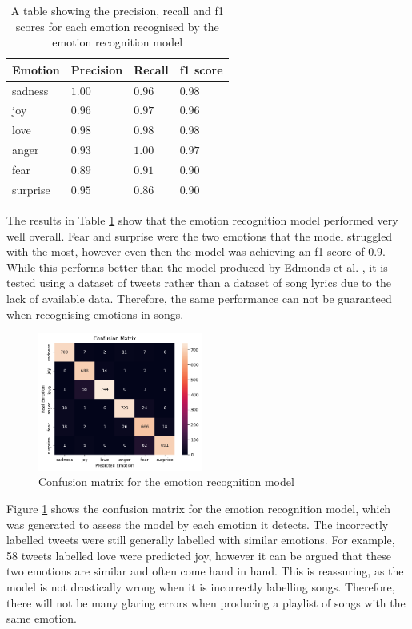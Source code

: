 \documentclass[11pt]{article}
\begin{document}
\begin{table}[h]
    \centering
    \caption{A table showing the precision, recall and f1 scores for each emotion recognised by the emotion recognition model}
    \begin{tabularx}{0.48\textwidth}{| X | X X X |} 
      \hline
      Emotion & Precision & Recall & f1 score\\ \hline
      sadness & $1.00$ & $0.96$ & $0.98$ \\ 
      joy & $0.96$ & $0.97$ & $0.96$ \\ 
      love & $0.98$ & $0.98$ & $0.98$ \\ 
      anger & $0.93$ & $1.00$ & $0.97$ \\ 
      fear & $0.89$ & $0.91$ & $0.90$ \\ 
      surprise & $0.95$ & $0.86$ & $0.90$ \\ \hline
    \end{tabularx}
    \label{tbl:f1}
\end{table}

The results in Table \ref{tbl:f1} show that the emotion recognition model performed very well overall. Fear and surprise were the two emotions that the model struggled with the most, however even then the model was achieving an f1 score of 0.9. While this performs better than the model produced by Edmonds et al. \cite{edmonds-sedoc-2021-multi}, it is tested using a dataset of tweets rather than a dataset of song lyrics due to the lack of available data. Therefore, the same performance can not be guaranteed when recognising emotions in songs.


\begin{figure}[H]
    \centering
    \includegraphics[width=0.48\textwidth]{images/Confusion.png}
    \caption{Confusion matrix for the emotion recognition model}
    \label{fig:confusion}
\end{figure}

Figure \ref{fig:confusion} shows the confusion matrix for the emotion recognition model, which was generated to assess the model by each emotion it detects. The incorrectly labelled tweets were still generally labelled with similar emotions. For example, 58 tweets labelled love were predicted joy, however it can be argued that these two emotions are similar and often come hand in hand. This is reassuring, as the model is not drastically wrong when it is incorrectly labelling songs. Therefore, there will not be many glaring errors when producing a playlist of songs with the same emotion. 
\end{document}
